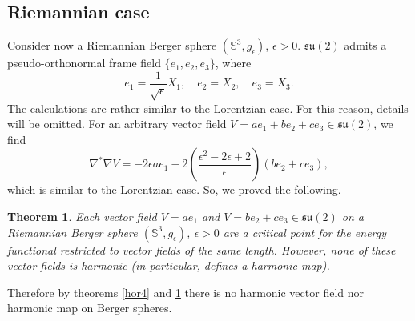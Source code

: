 \documentclass[11pt,oneside,leqno]{amsart}
\theoremstyle{plain}
\newtheorem{theorem}{Theorem}[section]
\begin{document}
\subsection{Riemannian case}
Consider now a Riemannian Berger sphere $({{\mathbb S}}^3, g_{\epsilon})$, $\epsilon>0$. ${{\mathfrak{su}}}(2)$ admits a pseudo-orthonormal frame field $\lbrace e_1,e_2,e_3\rbrace$, where
\begin{equation}\label{base3}
e_1=\frac{1}{\sqrt{\epsilon}}X_1,\quad e_2=X_2,\quad e_3=X_3.
\end{equation}
The calculations are rather similar to the Lorentzian case. For this reason, details will be omitted. For an
arbitrary vector field $V=ae_1+be_2+ce_3\in {{\mathfrak{su}}}(2)$, we find
\begin{equation}\label{base2}
 \nabla^*\nabla V=-2\epsilon ae_1-2(\frac{\epsilon^2-2\epsilon+2}{\epsilon})(be_2+ce_3),  
\end{equation}
which is similar to the Lorentzian case. So, we proved the
following.
\begin{theorem}\label{hor55}
Each vector field $V=ae_1$ and $V=be_2+ce_3\in {{\mathfrak{su}}}(2)$ on a Riemannian Berger sphere $({{\mathbb S}}^3, g_{\epsilon})$, $\epsilon>0$ are a critical point
for the energy functional restricted to vector fields of the same length. However, none of these vector fields is harmonic (in particular, defines a harmonic map).
\end{theorem}
Therefore by theorems \ref{hor4} and \ref{hor55} there is no harmonic vector field nor harmonic map on Berger spheres.
\end{document}
